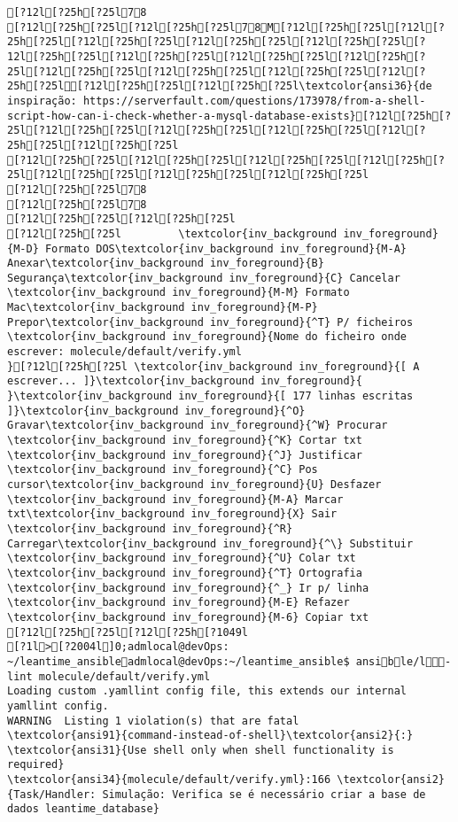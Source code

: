 \documentclass{scrartcl}
\begin{document}
\begin{Verbatim}
[?12l[?25h[?25l78
[?12l[?25h[?25l[?12l[?25h[?25l78M[?12l[?25h[?25l[?12l[?25h[?25l[?12l[?25h[?25l[?12l[?25h[?25l[?12l[?25h[?25l[?12l[?25h[?25l[?12l[?25h[?25l[?12l[?25h[?25l[?12l[?25h[?25l[?12l[?25h[?25l[?12l[?25h[?25l[?12l[?25h[?25l[?12l[?25h[?25l[?12l[?25h[?25l[?12l[?25h[?25l\textcolor{ansi36}{de inspiração: https://serverfault.com/questions/173978/from-a-shell-script-how-can-i-check-whether-a-mysql-database-exists}[?12l[?25h[?25l[?12l[?25h[?25l[?12l[?25h[?25l[?12l[?25h[?25l[?12l[?25h[?25l[?12l[?25h[?25l
[?12l[?25h[?25l[?12l[?25h[?25l[?12l[?25h[?25l[?12l[?25h[?25l[?12l[?25h[?25l[?12l[?25h[?25l[?12l[?25h[?25l
[?12l[?25h[?25l78
[?12l[?25h[?25l78
[?12l[?25h[?25l[?12l[?25h[?25l
[?12l[?25h[?25l         \textcolor{inv_background inv_foreground}{M-D} Formato DOS\textcolor{inv_background inv_foreground}{M-A} Anexar\textcolor{inv_background inv_foreground}{B} Segurança\textcolor{inv_background inv_foreground}{C} Cancelar           \textcolor{inv_background inv_foreground}{M-M} Formato Mac\textcolor{inv_background inv_foreground}{M-P} Prepor\textcolor{inv_background inv_foreground}{^T} P/ ficheiros
\textcolor{inv_background inv_foreground}{Nome do ficheiro onde escrever: molecule/default/verify.yml                                                                               }[?12l[?25h[?25l \textcolor{inv_background inv_foreground}{[ A escrever... ]}\textcolor{inv_background inv_foreground}{          }\textcolor{inv_background inv_foreground}{[ 177 linhas escritas ]}\textcolor{inv_background inv_foreground}{^O} Gravar\textcolor{inv_background inv_foreground}{^W} Procurar      \textcolor{inv_background inv_foreground}{^K} Cortar txt    \textcolor{inv_background inv_foreground}{^J} Justificar    \textcolor{inv_background inv_foreground}{^C} Pos cursor\textcolor{inv_background inv_foreground}{U} Desfazer     \textcolor{inv_background inv_foreground}{M-A} Marcar txt\textcolor{inv_background inv_foreground}{X} Sair    \textcolor{inv_background inv_foreground}{^R} Carregar\textcolor{inv_background inv_foreground}{^\} Substituir    \textcolor{inv_background inv_foreground}{^U} Colar txt     \textcolor{inv_background inv_foreground}{^T} Ortografia    \textcolor{inv_background inv_foreground}{^_} Ir p/ linha   \textcolor{inv_background inv_foreground}{M-E} Refazer      \textcolor{inv_background inv_foreground}{M-6} Copiar txt
[?12l[?25h[?25l[?12l[?25h[?1049l
[?1l>[?2004l]0;admlocal@devOps: ~/leantime_ansibleadmlocal@devOps:~/leantime_ansible$ ansible/l-lint molecule/default/verify.yml 
Loading custom .yamllint config file, this extends our internal yamllint config.
WARNING  Listing 1 violation(s) that are fatal
\textcolor{ansi91}{command-instead-of-shell}\textcolor{ansi2}{:} \textcolor{ansi31}{Use shell only when shell functionality is required}
\textcolor{ansi34}{molecule/default/verify.yml}:166 \textcolor{ansi2}{Task/Handler: Simulação: Verifica se é necessário criar a base de dados leantime_database}


\end{Verbatim}
\end{document}
